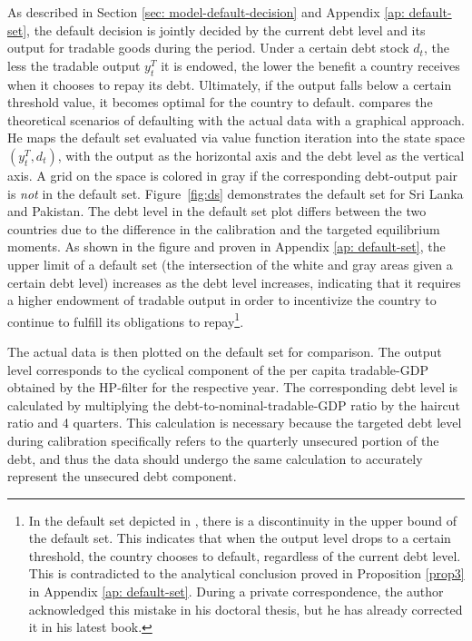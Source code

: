 As described in Section \ref{sec: model-default-decision} and Appendix \ref{ap: default-set}, the default decision is jointly decided by the current debt level and its output for tradable goods during the period. Under a certain debt stock $d_t$, the less the tradable output $y^T_t$ it is endowed, the lower the benefit a country receives when it chooses to repay its debt.
Ultimately, if the output falls below a certain threshold value, it becomes optimal for the country to default.
\citet{Hinrichsen_2020-chapter4} compares the theoretical scenarios of defaulting with the actual data with a graphical approach. He maps the default set evaluated via value function iteration into the state space $(y^T_t, d_t)$, with the output as the horizontal axis and the debt level as the vertical axis. A grid on the space is colored in gray if the corresponding debt-output pair is \emph{not} in the default set. Figure~\ref{fig:ds} demonstrates the default set for Sri Lanka and Pakistan. The debt level in the default set plot differs between the two countries due to the difference in the calibration and the targeted equilibrium moments. As shown in the figure and proven in Appendix \ref{ap: default-set}, the upper limit of a default set (the intersection of the white and gray areas given a certain debt level) increases as the debt level increases, indicating that it requires a higher endowment of tradable output in order to incentivize the country to continue to fulfill its obligations to repay\footnote{
    In the default set depicted in \citet{Hinrichsen_2020-chapter4}, there is a discontinuity in the upper bound of the default set. This indicates that when the output level drops to a certain threshold, the country chooses to default, regardless of the current debt level. This is contradicted to the analytical conclusion proved in Proposition \ref{prop3} in Appendix \ref{ap: default-set}. During a private correspondence, the author acknowledged this mistake in his doctoral thesis, but he has already corrected it in his latest book.
}.

The actual data is then plotted on the default set for comparison. The output level corresponds to the cyclical component of the per capita tradable-GDP obtained by the HP-filter for the respective year.
The corresponding debt level is calculated by multiplying the debt-to-nominal-tradable-GDP ratio by the haircut ratio and 4 quarters. This calculation is necessary because the targeted debt level during calibration specifically refers to the quarterly unsecured portion of the debt, and thus the data should undergo the same calculation to accurately represent the unsecured debt component.

